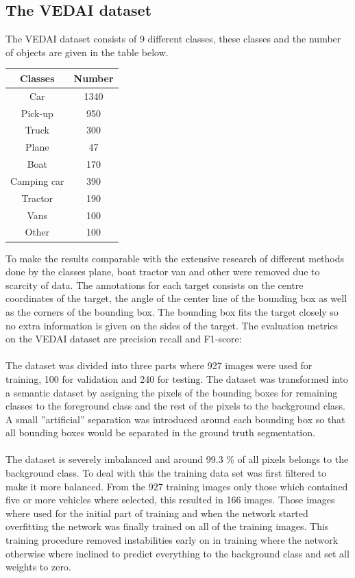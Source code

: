 \documentclass{kththesis}
\begin{document}
\subsection{The VEDAI dataset}
The VEDAI dataset \cite{razakarivony_vehicle_2015} consists of 9 different classes, these classes and the number of objects are given in the table below.\begin{center}
\begin{tabular}{|c|c|}
\hline
\textbf{Classes} & \textbf{Number}\\
\hline
Car & 1340\\
Pick-up & 950\\
Truck & 300\\
Plane & 47\\
Boat & 170\\
Camping car & 390\\
Tractor & 190\\
Vans & 100\\
Other & 100\\
\hline
\end{tabular}
\end{center}
To make the results comparable with the extensive research of different methods done by \cite{zhong_robust_2017} the classes plane, boat tractor van and other were removed due to scarcity of data.  The annotations for each target consists on the centre coordinates of the target, the angle of the center line of the bounding box as well as the corners of the bounding box. The bounding box fits the target closely so no extra information is given on the sides of the target. The evaluation metrics on the VEDAI dataset are precision recall and F1-score:\\
\\
The dataset was divided into three parts where 927 images were used for training, 100 for validation and 240 for testing. The dataset was transformed into a semantic dataset by assigning the pixels of the bounding boxes for remaining classes to the foreground class and the rest of the pixels to the background class. A small ''artificial'' separation was introduced around each bounding box so that all bounding boxes would be separated in the ground truth segmentation.\\
\\
The dataset is severely imbalanced and around 99.3 \% of all pixels belongs to the background class. To deal with this the training data set was first filtered to make it more balanced. From the 927 training images only those which contained five or more vehicles where selected, this resulted in 166 images. Those images where used for the initial part of training and when the network started overfitting the network was finally trained on all of the training images. This training procedure removed instabilities early on in training where the network otherwise where inclined to predict everything to the background class and set all weights to zero.
\newpage
\end{document}
